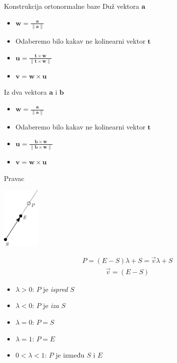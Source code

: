 \documentclass[9pt]{beamer}
\begin{document}
\begin{frame}{Konstrukcija ortonormalne baze}
	Duž vektora $\mathbf{a}$ 
	\begin{itemize}
		\item $\mathbf{w} = \frac{\mathbf{a}}{\lVert\mathbf{a}\rVert}$
		\item Odaberemo bilo kakav ne kolinearni vektor $\mathbf{t}$
		\item $\mathbf{u} = \frac{\mathbf{t}\times \mathbf{w}}{\lVert\mathbf{t}\times \mathbf{w}\rVert}$
		\item $\mathbf{v} = \mathbf{w}\times \mathbf{u}$
	\end{itemize}
	Iz dva vektora  $\mathbf{a}$  i  $\mathbf{b}$ 
	\begin{itemize}
		\item $\mathbf{w} = \frac{\mathbf{a}}{\lVert\mathbf{a}\rVert}$
		\item Odaberemo bilo kakav ne kolinearni vektor $\mathbf{t}$
		\item $\mathbf{u} = \frac{\mathbf{b}\times \mathbf{w}}{\lVert\mathbf{b}\times \mathbf{w}\rVert}$
		\item $\mathbf{v} = \mathbf{w}\times \mathbf{u}$
	\end{itemize}
\end{frame}
	
\begin{frame}{Pravac}
	\begin{center}
		\includegraphics[height=3cm]{./slike/linear_algebra_pravci.png}
	\end{center}
	\begin{align*}
		P = (E-S)\lambda + S = \vec{v}\lambda + S
	\end{align*}
	\begin{align*}
	\vec{v} = (E-S)
	\end{align*}
	
	\begin{itemize}
		\item $\lambda > 0$: $P$ je \textit{ispred} $S$
		\item $\lambda < 0$: $P$ je \textit{iza} $S$
		\item $\lambda = 0$: $P = S$
		\item $\lambda = 1$: $P = E$
		\item $0 < \lambda < 1$: $P$ je između $S$ i $E$
	\end{itemize}
\end{frame}
\end{document}
